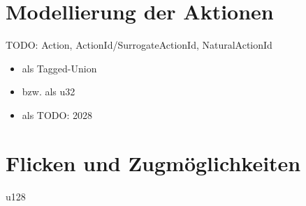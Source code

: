 \section{Modellierung der Aktionen}

TODO: Action, ActionId/SurrogateActionId, NaturalActionId



\begin{itemize}
    \item {} als Tagged-Union
    \item {} bzw.  als \ac{u32}
    \item {} als TODO: 2028
\end{itemize}

\section{Flicken und Zugmöglichkeiten}

\acs{u128}

\pagebreak

